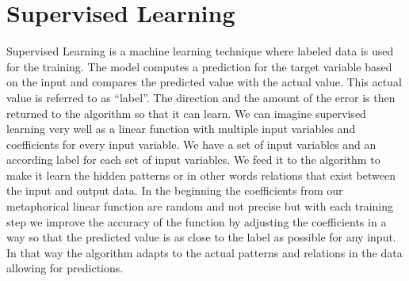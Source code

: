 \documentclass[a4paper,12pt]{report}
\begin{document}
	\section{Supervised Learning}
	Supervised Learning is a machine learning technique where labeled data is used for the training. The model computes a prediction for the target variable based on the input and compares the predicted value with the actual value. This actual value is referred to as “label”. The direction and the amount of the error is then returned to the algorithm so that it can learn. We can imagine supervised learning very well as a linear function with multiple input variables and coefficients for every input variable. We have a set of input variables and an according label for each set of input variables. We feed it to the algorithm to make it learn the hidden patterns or in other words relations that exist between the input and output data. In the beginning the coefficients from our metaphorical linear function are random and not precise but with each training step we improve the accuracy of the function by adjusting the coefficients in a way so that the predicted value is as close to the label as possible for any input. In that way the algorithm adapts to the actual patterns and relations in the data allowing for predictions. \cite{48}
\end{document}
